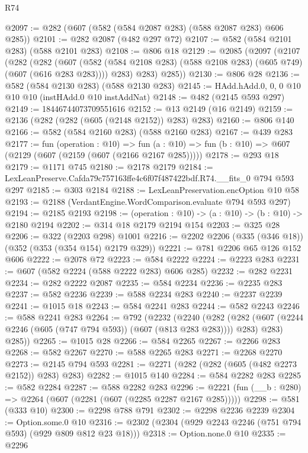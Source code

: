 \begin{lexlean}{R74}
\begin{coremodule}
@2097 := @282 (@607 (@582 (@584 @2087 @283) (@588 @2087 @283) @606 @285))
@2101 := @282 @2087 (@482 @297 @72)
@2107 := @582 (@584 @2101 @283) (@588 @2101 @283)
@2108 := @806 @18
@2129 := @2085
    (@2097
      (@2107
        (@282
          (@282
            (@607 (@582 (@584 @2108 @283) (@588 @2108 @283) (@605 @749) (@607 (@616 @283 @283))))
            @283)
          @283)
        @285))
@2130 := @806 @28
@2136 := @582 (@584 @2130 @283) (@588 @2130 @283)
@2145 := HAdd.hAdd.{0, 0, 0} @10 @10 @10 (instHAdd.{0} @10 instAddNat)
@2148 := @482 (@2145 @593 @297)
@2149 := 18446744073709551616
@2152 := @13 @2149 (@16 @2149)
@2159 := @2136 (@282 (@282 (@605 (@2148 @2152)) @283) @283)
@2160 := @806 @140
@2166 := @582 (@584 @2160 @283) (@588 @2160 @283)
@2167 := @439 @283
@2177 := fun (operation : @10) =>
  fun (a : @10) => fun (b : @10) => @607 (@2129 (@607 (@2159 (@607 (@2166 @2167 @285)))))
@2178 := @293 @18
@2179 := @1171 @745
@2180 := @2178 @2179
@2184 := LexLeanPreserve.Cafda79c757163ffe4c6f07f487422bdf.R74.__fits_0 @794 @593 @297
@2185 := @303 @2184
@2188 := LexLeanPreservation.encOption @10 @58
@2193 := @2188 (VerdantEngine.WordComparison.evaluate @794 @593 @297)
@2194 := @2185 @2193
@2198 := (operation : @10) -> (a : @10) -> (b : @10) -> @2180 @2194
@2202 := @314 @18 @2179 @2194 @154
@2203 := @325 @28
@2206 := @322 (@2203 @298) @1001
@2216 := @2202 @2206 (@335 (@346 @18)) (@352 (@353 (@354 @154) @2179 @329))
@2221 := @781 @2206 @65 @126 @152 @606
@2222 := @2078 @72
@2223 := @584 @2222
@2224 := @2223 @283
@2231 := @607 (@582 @2224 (@588 @2222 @283) @606 @285)
@2232 := @282 @2231
@2234 := @282 @2222 @2087
@2235 := @584 @2234
@2236 := @2235 @283
@2237 := @582 @2236
@2239 := @588 @2234 @283
@2240 := @2237 @2239
@2241 := @1015 @18
@2243 := @584 @2241 @283
@2244 := @582 @2243
@2246 := @588 @2241 @283
@2264 := @792
    (@2232
      (@2240
        (@282 (@282 (@607 (@2244 @2246 (@605 (@747 @794 @593)) (@607 (@813 @283 @283)))) @283) @283)
        @285))
@2265 := @1015 @28
@2266 := @584 @2265
@2267 := @2266 @283
@2268 := @582 @2267
@2270 := @588 @2265 @283
@2271 := @2268 @2270
@2273 := @2145 @794 @593
@2281 := @2271 (@282 (@282 (@605 (@482 @2273 @2152)) @283) @283)
@2282 := @1015 @140
@2284 := @584 @2282 @283
@2285 := @582 @2284
@2287 := @588 @2282 @283
@2296 := @2221 (fun (__b : @280) => @2264 (@607 (@2281 (@607 (@2285 @2287 @2167 @285)))))
@2298 := @581 (@333 @10)
@2300 := @2298 @788 @791
@2302 := @2298 @2236 @2239
@2304 := Option.some.{0} @10
@2316 := @2302 (@2304 (@929 @2243 @2246 (@751 @794 @593) (@929 @809 @812 @23 @18)))
@2318 := Option.none.{0} @10
@2335 := @2296

\end{coremodule}
\end{lexlean}
